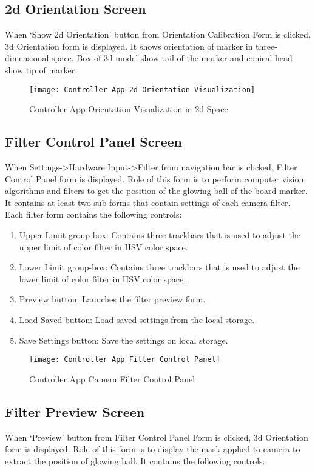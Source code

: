 \subsection{2d Orientation Screen}
When ‘Show 2d Orientation’ button from Orientation Calibration Form is clicked, 3d Orientation form is displayed. It shows orientation of marker in three-dimensional space. Box of 3d model show tail of the marker and conical head show tip of marker.
\begin{figure}[h]
  \centering
  \texttt{[image: Controller App 2d Orientation Visualization]}
  \caption{Controller App Orientation Visualization in 2d Space}
\end{figure}

\subsection{Filter Control Panel Screen}
When Settings->Hardware Input->Filter from navigation bar is clicked, Filter Control Panel form is displayed. Role of this form is to perform computer vision algorithms and filters to get the position of the glowing ball of the board marker. It contains at least two sub-forms that contain settings of each camera filter. Each filter form contains the following controls:

\begin{enumerate}

\item Upper Limit group-box: Contains three trackbars that is used to adjust the upper limit of color filter in HSV color space.
\item Lower Limit group-box: Contains three trackbars that is used to adjust the lower limit of color filter in HSV color space.
\item Preview button: Launches the filter preview form.
\item Load Saved button: Load saved settings from the local storage.
\item Save Settings button: Save the settings on local storage.

\end{enumerate}


\begin{figure}[h]
  \centering
  \texttt{[image: Controller App Filter Control Panel]}
  \caption{Controller App Camera Filter Control Panel}
\end{figure}

\subsection{Filter Preview Screen}
When ‘Preview’ button from Filter Control Panel Form is clicked, 3d Orientation form is displayed. Role of this form is to display the mask applied to camera to extract the position of glowing ball. It contains the following controls:

